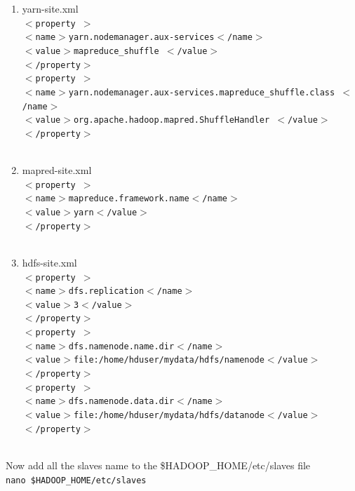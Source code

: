 \documentclass[12pt]{book}
\newcommand{\shellcmd}[1]{\\\indent\texttt{\footnotesize #1}\\}
\begin{document}
\begin{itemize}
\begin{enumerate}
 \item yarn-site.xml
       \shellcmd{$<$property $>$\\\indent 
                $<$name$>$yarn.nodemanager.aux-services$<$/name$>$ \\\indent 
                $<$value$>$mapreduce\_shuffle $<$/value$>$\\\indent 
                $<$/property$>$\\\indent 
                $<$property $>$\\\indent 
                $<$name$>$yarn.nodemanager.aux-services.mapreduce\_shuffle.class $<$/name$>$ \\\indent 
                $<$value$>$org.apache.hadoop.mapred.ShuffleHandler $<$/value$>$\\\indent 
                $<$/property$>$\\\indent}
  \item mapred-site.xml
       \shellcmd{$<$property $>$\\\indent 
                $<$name$>$mapreduce.framework.name$<$/name$>$ \\\indent 
                $<$value$>$yarn$<$/value$>$\\\indent 
                $<$/property$>$\\\indent}
  \item hdfs-site.xml
       \shellcmd{$<$property $>$\\\indent 
                $<$name$>$dfs.replication$<$/name$>$ \\\indent 
                $<$value$>$3$<$/value$>$\\\indent 
                $<$/property$>$\\\indent 
                $<$property $>$\\\indent 
                $<$name$>$dfs.namenode.name.dir$<$/name$>$ \\\indent 
                $<$value$>$file:/home/hduser/mydata/hdfs/namenode$<$/value$>$\\\indent 
                $<$/property$>$\\\indent 
                $<$property $>$\\\indent 
                $<$name$>$dfs.namenode.data.dir$<$/name$>$ \\\indent 
                $<$value$>$file:/home/hduser/mydata/hdfs/datanode$<$/value$>$\\\indent 
                $<$/property$>$\\\indent}
\end{enumerate}
Now add all the slaves name to the \$HADOOP\_HOME/etc/slaves file
\shellcmd{nano \$HADOOP\_HOME/etc/slaves}


\end{itemize}
\end{document}
